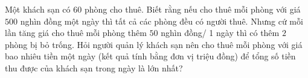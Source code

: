 \begin{ex}%
	Một khách sạn có $60$ phòng cho thuê. Biết rằng nếu cho thuê mỗi phòng với giá $500$ nghìn đồng một ngày thì tất cả các phòng đều có người thuê. Nhưng cứ mỗi lần tăng giá cho thuê mỗi phòng thêm $50$ nghìn đồng/ 1 ngày thì có thêm $2$ phòng bị bỏ trống. Hỏi người quản lý khách sạn nên cho thuê mỗi phòng với giá bao nhiêu tiền một ngày (kết quả tính bằng đơn vị triệu đồng) để tổng số tiền thu được của khách sạn trong ngày là lớn nhất?
\end{ex}

